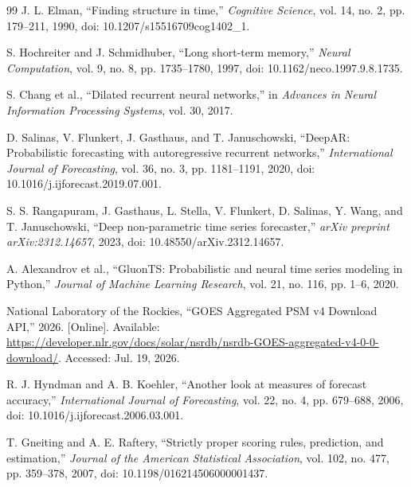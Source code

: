 \documentclass[10pt,conference,a4paper]{IEEEtran}
\begin{document}
\begin{thebibliography}{99}
J. L. Elman, ``Finding structure in time,'' \textit{Cognitive Science},
vol. 14, no. 2, pp. 179--211, 1990,
doi: 10.1207/s15516709cog1402\_1.

S. Hochreiter and J. Schmidhuber, ``Long short-term memory,''
\textit{Neural Computation}, vol. 9, no. 8, pp. 1735--1780, 1997,
doi: 10.1162/neco.1997.9.8.1735.

S. Chang et al., ``Dilated recurrent neural networks,'' in
\textit{Advances in Neural Information Processing Systems}, vol. 30, 2017.

D. Salinas, V. Flunkert, J. Gasthaus, and T. Januschowski, ``DeepAR:
Probabilistic forecasting with autoregressive recurrent networks,''
\textit{International Journal of Forecasting}, vol. 36, no. 3,
pp. 1181--1191, 2020, doi: 10.1016/j.ijforecast.2019.07.001.

S. S. Rangapuram, J. Gasthaus, L. Stella, V. Flunkert, D. Salinas, Y. Wang,
and T. Januschowski, ``Deep non-parametric time series forecaster,''
\textit{arXiv preprint arXiv:2312.14657}, 2023,
doi: 10.48550/arXiv.2312.14657.

A. Alexandrov et al., ``GluonTS: Probabilistic and neural time series modeling
in Python,'' \textit{Journal of Machine Learning Research}, vol. 21, no. 116,
pp. 1--6, 2020.

National Laboratory of the Rockies, ``GOES Aggregated PSM v4 Download API,''
2026. [Online]. Available:
\url{https://developer.nlr.gov/docs/solar/nsrdb/nsrdb-GOES-aggregated-v4-0-0-download/}.
Accessed: Jul. 19, 2026.

R. J. Hyndman and A. B. Koehler, ``Another look at measures of forecast
accuracy,'' \textit{International Journal of Forecasting}, vol. 22, no. 4,
pp. 679--688, 2006, doi: 10.1016/j.ijforecast.2006.03.001.

T. Gneiting and A. E. Raftery, ``Strictly proper scoring rules, prediction, and
estimation,'' \textit{Journal of the American Statistical Association},
vol. 102, no. 477, pp. 359--378, 2007,
doi: 10.1198/016214506000001437.

\end{thebibliography}
\end{document}
